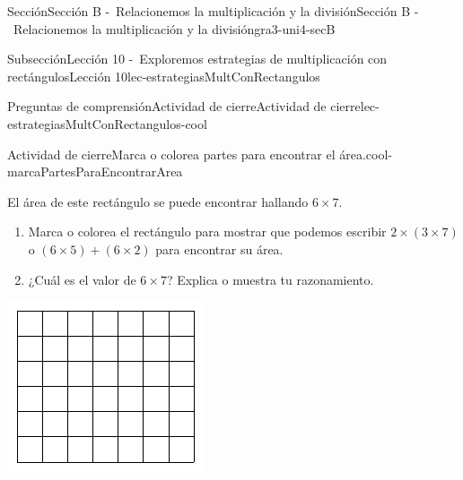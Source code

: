 \begin{sectionptx}{Sección}{Sección B -~Relacionemos la multiplicación y la división}{}{Sección B -~Relacionemos la multiplicación y la división}{}{}{gra3-uni4-secB}
\begin{subsectionptx}{Subsección}{Lección 10 -~Exploremos estrategias de multiplicación con rectángulos}{}{Lección 10}{}{}{lec-estrategiasMultConRectangulos}
\begin{reading-questions-subsubsection}{Preguntas de comprensión}{Actividad de cierre}{}{Actividad de cierre}{}{}{lec-estrategiasMultConRectangulos-cool}
\begin{project}{Actividad de cierre}{Marca o colorea partes para encontrar el área.}{cool-marcaPartesParaEncontrarArea}%
\begin{sidebyside}{2}{0}{0}{0}%
\begin{sbspanel}{0.6}%
El área de este rectángulo se puede encontrar hallando \(6 \times 7\).%
%
\begin{enumerate}[label={(\alph*)}]
\item{}Marca o colorea el rectángulo para mostrar que podemos escribir \(2 \times (3 \times 7)\) o \((6 \times 5) + (6 \times 2)\) para encontrar su área.%
\item{}¿Cuál es el valor de \(6 \times 7\)? Explica o muestra tu razonamiento.%
\end{enumerate}
\end{sbspanel}%
\begin{sbspanel}{0.4}%
\includegraphics[scale=1.4, max width=\linewidth, center]{external/svg-source/tikz-file-153042.pdf}
\end{sbspanel}%
\end{sidebyside}%
\end{project}%

\end{reading-questions-subsubsection}
\end{subsectionptx}
\end{sectionptx}

